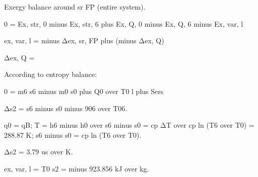Exergy balance around sr FP (entire system).

0 = Ex, str, 0 minus Ex, str, 6 plus Ex, Q, 0 minus Ex, Q, 6 minus Ex, var, l

ex, var, l = minus Δex, sr, FP plus (minus Δex, Q)

Δex, Q = 

According to entropy balance:

0 = m6 s6 minus m0 s0 plus Q0 over T0 l plus Sers

Δs2 = s6 minus s0 minus 906 over T06.

q0 = qB; T = h6 minus h0 over s6 minus s0 = cp ΔT over cp ln (T6 over T0) = 288.87 K; s6 minus s0 = cp ln (T6 over T0).

Δs2 = 3.79 us over K.

ex, var, l = T0 s2 = minus 923.856 kJ over kg.